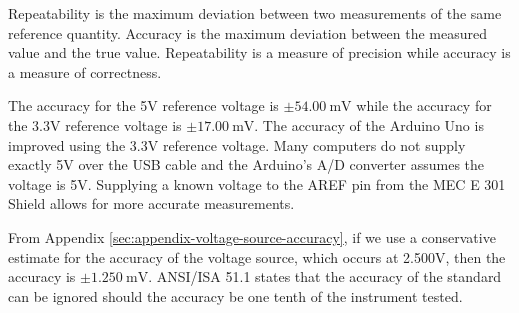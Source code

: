 Repeatability is the maximum deviation between two measurements of the same reference quantity. Accuracy is the maximum deviation between the
measured value and the true value. Repeatability is a measure of precision while accuracy is a measure of correctness.



\noindent The accuracy for the 5V reference voltage is $\pm \qty{54.00}{\milli\volt}$ while the accuracy for the 3.3V reference voltage is $\pm \qty{17.00}{\milli\volt}$. The accuracy of the Arduino Uno is improved
using the 3.3V reference voltage. Many computers do not supply exactly 5V over the USB cable and the Arduino's A/D converter assumes the voltage is 5V. 
Supplying a known voltage to the AREF pin from the MEC E 301 Shield allows for more accurate measurements.

\noindent From Appendix \ref{sec:appendix-voltage-source-accuracy}, if we use a conservative estimate for the accuracy of the voltage source, which occurs at 2.500V, then the accuracy is $\pm \qty{1.250}{\milli\volt}$. ANSI/ISA 51.1 states that the accuracy of the standard
can be ignored should the accuracy be one tenth of the instrument tested. %

